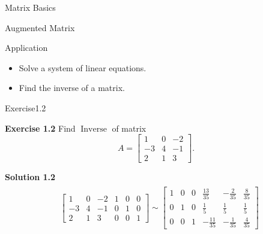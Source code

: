\documentclass{beamer}
\begin{document}
\begin{section}{Matrix Basics}
\begin{frame}[label=10]{Augmented Matrix}
    \begin{block}{Application}
        \begin{itemize}
            \item Solve a system of linear equations.
            \item Find the inverse of a matrix.
        \end{itemize}
    \end{block}
\end{frame}

\begin{frame}{Exercise1.2}
        \par \textbf{Exercise 1.2} Find $\operatorname{Inverse}$ of matrix $$A = \left[ \begin{array}{ccc} 1&0&-2 \\ -3&4&-1 \\ 2&1&3\end{array}\right].$$

        \pause 
        \par \textbf{Solution 1.2}
        \begin{equation*}
            \begin{aligned}
                & \begin{gathered}
                    \left[\begin{array}{ccc|ccc}
                    1&0&-2 &1 & 0& 0\\ -3&4&-1 & 0&1&0 \\ 2&1&3&0&0&1 
                    \end{array}\right]
                    \sim\left[\begin{array}{ccc|ccc}
                    1&0&0 &\frac{13}{35} & -\frac{2}{35} & \frac{8}{35} \\ 0&1&0 & \frac{1}{5}&\frac{1}{5}&\frac{1}{5} \\ 0&0&1 & -\frac{11}{35}& -\frac{1}{35} & \frac{4}{35} 
                    \end{array}\right] \\
                \end{gathered} \\
            \end{aligned}
        \end{equation*}
\end{frame}


\end{section}
\end{document}
